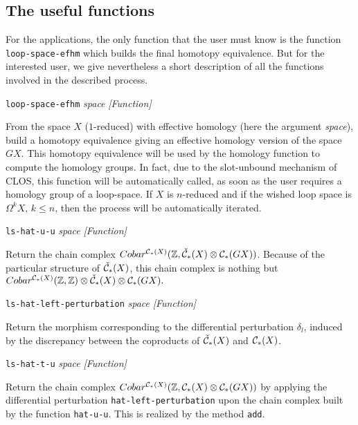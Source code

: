 \subsection {The useful functions}

For the applications, the only function that the user must know is the function {\tt loop-space-efhm}
which builds the final homotopy equivalence. But for the
interested user, we give nevertheless a short description of all the functions
involved in the described process.

\vskip 0.30cm
{\parindent=0mm
{\leftskip=5mm
{\tt loop-space-efhm} {\em space}  \hfill {\em [Function]} \par}
{\leftskip=15mm
From the space $X$ ($1$-reduced) with effective homology (here the argument {\em space}), build
a homotopy equivalence giving an effective homology version  of the space $GX$. This homotopy
equivalence will be used by the homology function to compute the homology groups. In fact, due to
the slot-unbound mechanism of CLOS, this function will be automatically called, as soon
as the user requires a homology group of a loop-space.
If $X$ is $n$-reduced and if the wished loop space is $\Omega^k X, \, k \leq n$, then 
the process will be automatically  iterated. \par}
{\leftskip=5mm
{\tt ls-hat-u-u} {\em space}  \hfill {\em [Function]} \par}
{\leftskip=15mm
Return the chain complex 
$Cobar^{{\cal C}_*(X)}({{\Bbb Z}}, {\check{\cal C}}_*(X)\otimes {\cal C_*}(GX))$. Because of
the particular structure of ${\check{\cal C}}_*(X)$, this chain complex is nothing but
$Cobar^{{\cal C}_*(X)}({{\Bbb Z}},{{\Bbb Z}})\otimes {\check{\cal C}}_*(X)\otimes {\cal C_*}(GX).$
\par}
{\leftskip=5mm
{\tt ls-hat-left-perturbation} {\em space}  \hfill {\em [Function]} \par}
{\leftskip=15mm
Return the morphism corresponding to the differential perturbation $\delta_l$, induced by
the discrepancy between the coproducts of  ${\check{\cal C}}_*(X)$ and ${\cal C}_*(X)$. \par}
{\leftskip=5mm
{\tt ls-hat-t-u} {\em space}  \hfill {\em [Function]} \par}
{\leftskip=15mm
Return the chain complex
$Cobar^{{\cal C}_*(X)}({{\Bbb Z}}, {\cal C}_*(X)\otimes {\cal C_*}(GX))$ by applying
the differential perturbation {\tt hat-left-perturbation} upon
the chain complex built by the function {\tt hat-u-u}. This is realized by the method
{\tt add}. \par}
{\leftskip=5mm
}}
